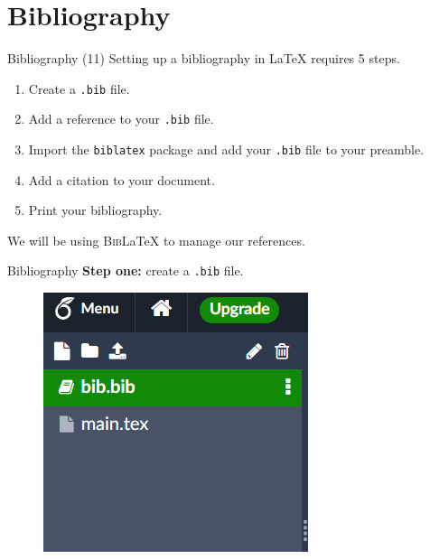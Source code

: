 \documentclass{beamer}
\newcommand{\filename}[1]{\texttt{#1}}
\begin{document}
\section{Bibliography}

\begin{frame}{Bibliography (11)}
    Setting up a bibliography in \LaTeX{} requires 5 steps.

    \medskip

    \begin{enumerate}
        \item Create a \filename{.bib} file.
        \item Add a reference to your \filename{.bib} file.
        \item Import the \texttt{biblatex} package and add your \filename{.bib} file to your preamble.
        \item Add a citation to your document.
        \item Print your bibliography.
    \end{enumerate}
    \bigskip
    We will be using \textsc{Bib}\LaTeX{} to manage our references.
\end{frame}

\begin{frame}{Bibliography}
    \textbf{Step one:} create a \filename{.bib} file.
    \medskip
    \centering
    \begin{figure}[hb]
        \includegraphics[scale=1]{./assets/bib.png}
    \end{figure}
\end{frame}
\end{document}
